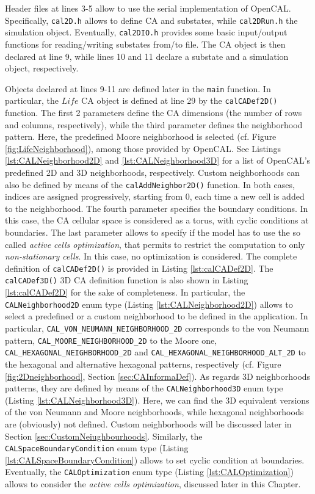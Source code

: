 Header files at lines 3-5 allow to use the serial implementation of
OpenCAL. Specifically, \verb'cal2D.h' allows to define CA and
substates, while \verb'cal2DRun.h' the simulation object. Eventually,
\verb'cal2DIO.h' provides some basic input/output functions for
reading/writing substates from/to file. The CA object is then declared
at line 9, while lines 10 and 11 declare a substate and a simulation
object, respectively.

Objects declared at lines 9-11 are defined later in the \verb'main'
function. In particular, the $Life$ CA object is defined at line 29 by
the \verb'calCADef2D()' function. The first 2 parameters define the CA
dimensions (the number of rows and columns, respectively), while the
third parameter defines the neighborhood pattern. Here, the predefined
Moore neighborhood is selected (cf. Figure
\ref{fig:LifeNeighborhood}), among those provided by OpenCAL. See
Listings \ref{lst:CALNeighborhood2D} and \ref{lst:CALNeighborhood3D}
for a list of OpenCAL's predefined 2D and 3D neighborhoods,
respectively. Custom neighborhoods can also be defined by means of the
\verb'calAddNeighbor2D()' function. In both cases, indices are
assigned progressively, starting from 0, each time a new cell is added
to the neighborhood. The fourth parameter specifies the boundary
conditions. In this case, the CA cellular space is considered as a
torus, with cyclic conditions at boundaries. The last parameter allows
to specify if the model has to use the so called \emph{active cells
  optimization}, that permits to restrict the computation to only
\emph{non-stationary cells}. In this case, no optimization is
considered. The complete definition of \verb'calCADef2D()' is provided
in Listing \ref{lst:calCADef2D}. The \verb'calCADef3D()' 3D CA
definition function is also shown in Listing \ref{lst:calCADef2D} for
the sake of completeness. In particular, the \verb'CALNeighborhood2D'
enum type (Listing \ref{lst:CALNeighborhood2D}) allows to select a
predefined or a custom neighborhood to be defined in the
application. In particular, \verb'CAL_VON_NEUMANN_NEIGHBORHOOD_2D'
corresponds to the von Neumann pattern,
\verb'CAL_MOORE_NEIGHBORHOOD_2D' to the Moore one,
\verb'CAL_HEXAGONAL_NEIGHBORHOOD_2D' and
\verb'CAL_HEXAGONAL_NEIGHBORHOOD_ALT_2D' to the hexagonal and
alternative hexagonal patterns, respectively (cf. Figure
\ref{fig:2Dneighborhood}, Section \ref{sec:CAInformaDef}). As regards
3D neighborhoods patterns, they are defined by means of the
\verb'CALNeighborhood3D' enum type (Listing
\ref{lst:CALNeighborhood3D}). Here, we can find the 3D equivalent
versions of the von Neumann and Moore neighborhoods, while hexagonal
neighborhoods are (obviously) not defined. Custom neighborhoods will
be discussed later in Section
\ref{sec:CustomNeiughbourhoods}. Similarly, the
\verb'CALSpaceBoundaryCondition' enum type (Listing
\ref{lst:CALSpaceBoundaryCondition}) allows to set cyclic condition at
boundaries. Eventually, the \verb'CALOptimization' enum type (Listing
\ref{lst:CALOptimization}) allows to consider the \emph{active cells
  optimization}, discussed later in this Chapter.


